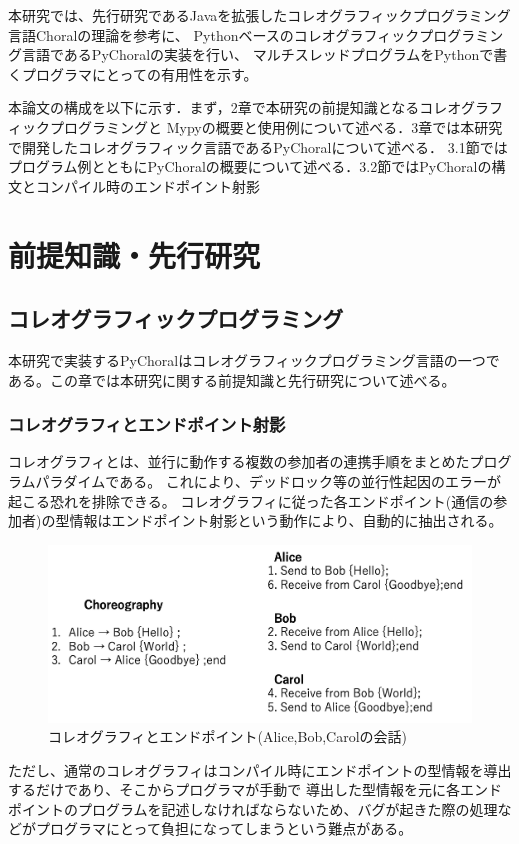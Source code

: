 \documentclass{thesis}
\begin{document}
本研究では、先行研究であるJavaを拡張したコレオグラフィックプログラミング言語Choralの理論を参考に、
Pythonベースのコレオグラフィックプログラミング言語であるPyChoralの実装を行い、
マルチスレッドプログラムをPythonで書くプログラマにとっての有用性を示す。

本論文の構成を以下に示す．まず，2章で本研究の前提知識となるコレオグラフィックプログラミングと
Mypyの概要と使用例について述べる．3章では本研究で開発したコレオグラフィック言語であるPyChoralについて述べる．
3.1節ではプログラム例とともにPyChoralの概要について述べる．3.2節ではPyChoralの構文とコンパイル時のエンドポイント射影
\chapter{前提知識・先行研究}
\section{コレオグラフィックプログラミング}
本研究で実装するPyChoralはコレオグラフィックプログラミング言語の一つである。この章では本研究に関する前提知識と先行研究について述べる。
\subsection{コレオグラフィとエンドポイント射影}
コレオグラフィ\cite{Choreographic}とは、並行に動作する複数の参加者の連携手順をまとめたプログラムパラダイムである。
これにより、デッドロック等の並行性起因のエラーが起こる恐れを排除できる。
コレオグラフィに従った各エンドポイント(通信の参加者)の型情報はエンドポイント射影\cite{endpoint}という動作により、自動的に抽出される。
\begin{figure}[H]
  \centering
  \includegraphics[scale=0.5]{image/choreography.png}
  \caption{コレオグラフィとエンドポイント(Alice,Bob,Carolの会話)}
\end{figure}
ただし、通常のコレオグラフィはコンパイル時にエンドポイントの型情報を導出するだけであり、そこからプログラマが手動で
導出した型情報を元に各エンドポイントのプログラムを記述しなければならないため、バグが起きた際の処理などがプログラマにとって負担になってしまうという難点がある。
\end{document}
